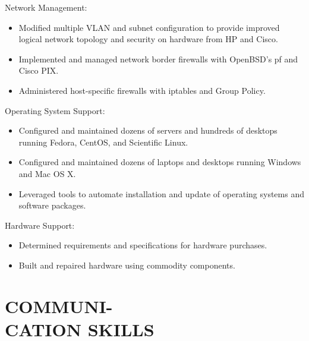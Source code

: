 \documentclass[line,margin]{res}
\begin{document}
\begin{resume}
    Network Management:
    \vspace{2 mm}
    \begin{itemize} \itemsep -1pt %
        \item Modified multiple VLAN and subnet configuration to provide
        improved logical network topology and security on hardware from
        HP and Cisco.
        \item Implemented and managed network border firewalls with
        OpenBSD's pf and Cisco PIX.
        \item Administered host-specific firewalls with iptables and Group
        Policy.
    \end{itemize}

    Operating System Support:
    \vspace{2 mm}
    \begin{itemize} \itemsep -1pt %
        \item Configured and maintained dozens of servers and hundreds of
        desktops running Fedora, CentOS, and Scientific Linux.
        \item Configured and maintained dozens of laptops and desktops
        running Windows and Mac OS X.
        \item Leveraged tools to automate installation and update of
        operating systems and software packages.
    \end{itemize}

    Hardware Support:
    \vspace{2 mm}
    \begin{itemize} \itemsep -1pt %
        \item Determined requirements and specifications for hardware purchases.
        \item Built and repaired hardware using commodity components.
    \end{itemize}


\section{COMMUNI- \\ CATION SKILLS}


\end{resume}
\end{document}
